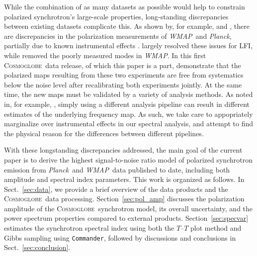 \documentclass[twocolumn]{../../common/aa}
\def\WMAP{\emph{WMAP}}
\def\Planck{\emph{Planck}}
\def\commander{\texttt{Commander}}
\newcommand{\cosmoglobe}{\textsc{Cosmoglobe}}
\begin{document}
While the combination of as many datasets as possible would help to constrain polarized synchrotron's large-scale properties, long-standing discrepancies between existing datasets complicate this. As shown by, for example, \citet{planck2014-a12} and \citet{weiland:2018}, there are discrepancies in the polarization measurements of \WMAP\ and \Planck, partially due to known instrumental effects \citep{bennett2012,planck2016-l02}. \citet{bp01} largely resolved these issues for LFI, while \citet{bp17} removed the poorly measured modes in \WMAP. In this first \cosmoglobe\ data release, of which this paper is a part, \citet{watts2023_dr1} demonstrate that the polarized maps resulting from these two experiments are free from systematics below the noise level after recalibrating both experiments jointly. At the same time, the new maps must be validated by a variety of analysis methods. As noted in, for example, \citet{weiland:2022}, simply using a different analysis pipeline can result in different estimates of the underlying frequency map. As such, we take care to appopriately marginalize over instrumental effects in our spectral analysis, and attempt to find the physical reason for the differences between different pipelines.

With these longstanding discrepancies addressed, the main goal of the current paper is to derive the highest signal-to-noise ratio model of polarized synchrotron emission from \Planck\ and \WMAP\ data published to date, including both amplitude and spectral index parameters. This work is organized as follows. In Sect.~\ref{sec:data}, we provide a brief overview of the data products and the \cosmoglobe\ data processing. Section~\ref{sec:pol_amp} discusses the polarization amplitude of the \cosmoglobe\ synchrotron model, its overall uncertainty, and the power spectrum properties compared to external products. Section~\ref{sec:specvar} estimates the synchrotron spectral index using both the $T$--$T$ plot method and Gibbs sampling using \commander, followed by discussions and conclusions in Sect.~\ref{sec:conclusion}.


\end{document}
